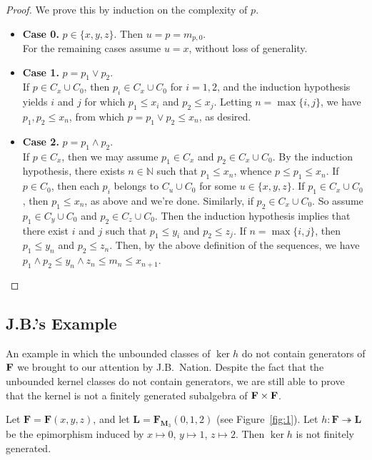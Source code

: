 \begin{proof} We prove this by induction on the complexity of $p$. 

\begin{itemize}
  \item {\bf Case 0.} $p\in \{x, y, z\}$. Then $u = p = m_{p,0}$.\\
  For the remaining cases assume $u = x$, without loss of generality.

  \item {\bf Case 1.} $p = p_1 \vee p_2$.  \\
  If $p \in C_x\cup C_0$, then $p_i \in C_x \cup C_0$ for $i = 1, 2$, and 
  the induction hypothesis yields $i$ and $j$ for which $p_1 \leqslant x_i$ 
  and $p_2 \leqslant x_j$. Letting $n = \max\{i, j\}$, we have 
  $p_1, p_2 \leqslant x_n$, from which $p = p_1 \vee p_2 \leqslant x_n$, as desired.

  \item {\bf Case 2.} $p = p_1 \wedge p_2$.  \\
  If $p \in C_x$, then we may assume $p_1 \in C_x$ and $p_2 \in C_x \cup C_0$. 
  By the induction hypothesis, there exists $n\in \mathbb N$ such that 
  $p_1 \leqslant x_n$, whence $p \leqslant p_1 \leqslant x_n$.
  If $p \in C_0$, then each $p_i$ belongs to $C_u \cup C_0$ for some 
  $u\in \{x, y, z\}$.  If $p_1 \in C_x \cup C_0$, then $p_1 \leqslant x_n$, as 
  above and we're done.  Similarly, if $p_2 \in C_x \cup C_0$.  So assume 
  $p_1 \in C_y \cup C_0$ and $p_2 \in C_z \cup C_0$. Then the induction 
  hypothesis implies that there exist $i$ and $j$ such that 
  $p_1 \leqslant y_i$ and $p_2 \leqslant z_j$. If $n = \max\{i, j\}$, then
  $p_1 \leqslant y_n$ and $p_2 \leqslant z_n$.  Then, by the above definition 
  of the sequences, we have $p_1 \wedge p_2 \leqslant y_n \wedge z_n \leqslant 
  m_n \leqslant x_{n+1}$.
\end{itemize}
\end{proof}



\subsection{J.B.'s Example}
An example in which the unbounded
classes of $\ker h$ do not contain generators of $\mathbf{F}$ we brought to our attention by J.B.~Nation.  Despite the fact that the unbounded kernel classes do not contain generators, we are still able to prove that the kernel is not a finitely generated subalgebra of $\mathbf{F} \times \mathbf{F}$.
\begin{proposition}
  \label{prop:2.2}
Let $\mathbf{F} = \mathbf{F}(x,y,z)$, and let $\mathbf{L} = \mathbf{F}_{\mathbf{M}_3}(0,1,2)$ (see Figure~\ref{fig:1}).  
Let $h\colon \mathbf{F} \twoheadrightarrow \mathbf{L}$ be the epimorphism induced by $x\mapsto 0$, $y\mapsto 1$, $z\mapsto 2$. Then $\operatorname{ker}h$ is not finitely generated.  
\end{proposition}


